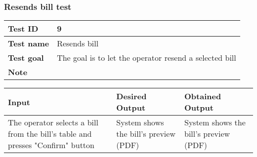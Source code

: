 {{		\subsubsection{Resends bill test}{
			\begin{center}
			\begin{tabular}{|p{4cm}|p{10cm}|}
			\hline
				\centering \vspace{1mm} \bfseries{Test ID} \vspace{1mm} & 
				\vspace{1mm} 9 \vspace{1mm}\\
			\hline
				\centering \vspace{1mm} \bfseries{Test name} \vspace{1mm} & 
				\vspace{1mm} Resends bill \vspace{1mm}\\
			\hline
				\centering \vspace{1mm} \bfseries{Test goal} \vspace{1mm} & 
				\vspace{1mm} The goal is to let the operator resend a selected bill\vspace{1mm}\\
			\hline
				\centering \vspace{1mm} \bfseries{Note} \vspace{1mm} & 
				\vspace{1mm}  \vspace{1mm}\\
			\hline
			\end{tabular}

			\begin{tabular}{|p{4cm}|p{5cm}|p{5cm}|}
			\hline
			\centering \vspace{1mm} \bfseries{Input} \vspace{1mm} & \vspace{1mm} \bfseries{Desired Output} \vspace{1mm} & \vspace{1mm} \bfseries{Obtained Output} \vspace{1mm}\\
			\hline
				\vspace{1mm} The operator selects a bill from the bill's table and presses "Confirm" button \vspace{1mm} &
				\vspace{1mm} System shows the bill's preview (PDF) \vspace{1mm} & 
				\vspace{1mm} System shows the bill's preview (PDF) \vspace{1mm} \\
			\hline
			\end{tabular}
			\end{center}
		}
		\clearpage

}}
